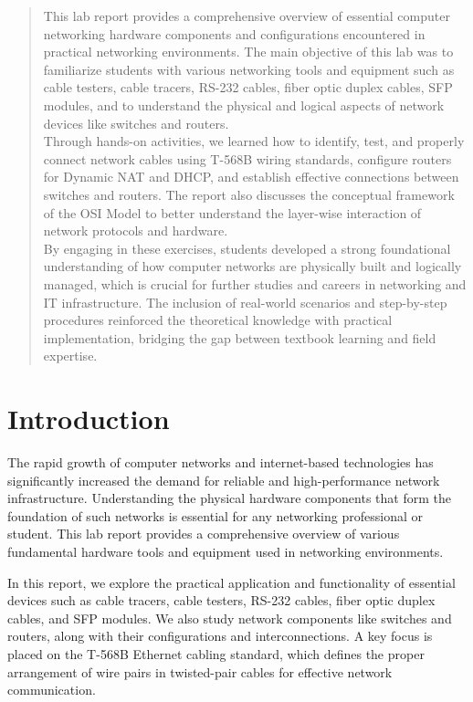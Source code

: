 \documentclass[12pt]{article}
\begin{document}
\begin{abstract}
This lab report provides a comprehensive overview of essential computer networking hardware components and configurations encountered in practical networking environments. The main objective of this lab was to familiarize students with various networking tools and equipment such as cable testers, cable tracers, RS-232 cables, fiber optic duplex cables, SFP modules, and to understand the physical and logical aspects of network devices like switches and routers.\\
Through hands-on activities, we learned how to identify, test, and properly connect network cables using T-568B wiring standards, configure routers for Dynamic NAT and DHCP, and establish effective connections between switches and routers. The report also discusses the conceptual framework of the OSI Model to better understand the layer-wise interaction of network protocols and hardware.\\
By engaging in these exercises, students developed a strong foundational understanding of how computer networks are physically built and logically managed, which is crucial for further studies and careers in networking and IT infrastructure. The inclusion of real-world scenarios and step-by-step procedures reinforced the theoretical knowledge with practical implementation, bridging the gap between textbook learning and field expertise.\\
\end{abstract}


\section{Introduction}
The rapid growth of computer networks and internet-based technologies has significantly increased the demand for reliable and high-performance network infrastructure. Understanding the physical hardware components that form the foundation of such networks is essential for any networking professional or student. This lab report provides a comprehensive overview of various fundamental hardware tools and equipment used in networking environments.

In this report, we explore the practical application and functionality of essential devices such as cable tracers, cable testers, RS-232 cables, fiber optic duplex cables, and SFP modules. We also study network components like switches and routers, along with their configurations and interconnections. A key focus is placed on the T-568B Ethernet cabling standard, which defines the proper arrangement of wire pairs in twisted-pair cables for effective network communication.
\end{document}
